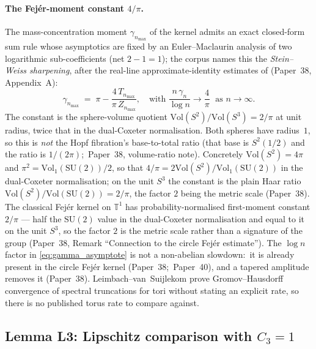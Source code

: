 \documentclass[11pt,a4paper]{article}
\theoremstyle{plain}
\theoremstyle{definition}
\newcommand{\nmax}{n_{\max}}
\newcommand{\sthree}{S^{3}}
\newcommand{\T}{\mathbb{T}}
\newcommand{\SU}{\mathrm{SU}}
\newcommand{\Vol}{\mathrm{Vol}}
\begin{document}
\paragraph{The Fej\'er-moment constant $4/\pi$.}
The mass-concentration moment $\gamma_{\nmax}$ of the kernel
admits an exact closed-form sum rule whose asymptotics are fixed by
an Euler--Maclaurin analysis of two logarithmic sub-coefficients
(net $2 - 1 = 1$); the corpus names this the \emph{Stein--Weiss
sharpening}, after the real-line approximate-identity estimates of
\cite{stein_weiss1971} (Paper~38, Appendix~A):
\begin{equation}
\gamma_{\nmax}
\;=\;
\pi - \frac{4\, T_{\nmax}}{\pi\, Z_{\nmax}},
\quad
\text{with } \frac{n\,\gamma_{n}}{\log n} \to \frac{4}{\pi}
\;\text{ as } n \to \infty.
\label{eq:gamma_asymptote}
\end{equation}
The constant is the sphere-volume quotient
$\Vol(S^{2})/\Vol(\sthree) = 2/\pi$ at unit radius, twice that in
the dual-Coxeter normalisation.  Both spheres have radius~$1$, so this is
\emph{not} the Hopf fibration's base-to-total ratio (that base is
$S^{2}(1/2)$ and the ratio is $1/(2\pi)$;\ Paper~38, volume-ratio note).  Concretely $\Vol(S^{2}) = 4\pi$ and
$\pi^{2} = \Vol_1(\SU(2))/2$, so that $4/\pi = 2\Vol(S^{2})/\Vol_1(\SU(2))$ in
the dual-Coxeter normalisation; on the unit $\sthree$ the constant is
the plain Haar ratio $\Vol(S^{2})/\Vol(\SU(2)) = 2/\pi$, the factor $2$
being the metric scale (Paper~38).
The classical Fej\'er kernel on $\T^{1}$ has probability-normalised
first-moment constant $2/\pi$ --- half the $\SU(2)$ value in the
dual-Coxeter normalisation and equal to it on the unit $\sthree$, so
the factor $2$ is the metric scale rather than a signature of the
group (Paper~38, Remark ``Connection to the circle Fej\'er estimate'').
The $\log n$ factor in \eqref{eq:gamma_asymptote} is not a
non-abelian slowdown:\ it is already present in the circle Fej\'er
kernel (Paper~38;\ Paper~40), and a tapered amplitude removes it
(Paper~38).  Leimbach--van~Suijlekom
\cite{leimbach_vs2024} prove Gromov--Hausdorff convergence of spectral
truncations for tori without stating an explicit rate, so there is no
published torus rate to compare against.

\subsection{Lemma L3: Lipschitz comparison with $C_{3} = 1$}
\end{document}
